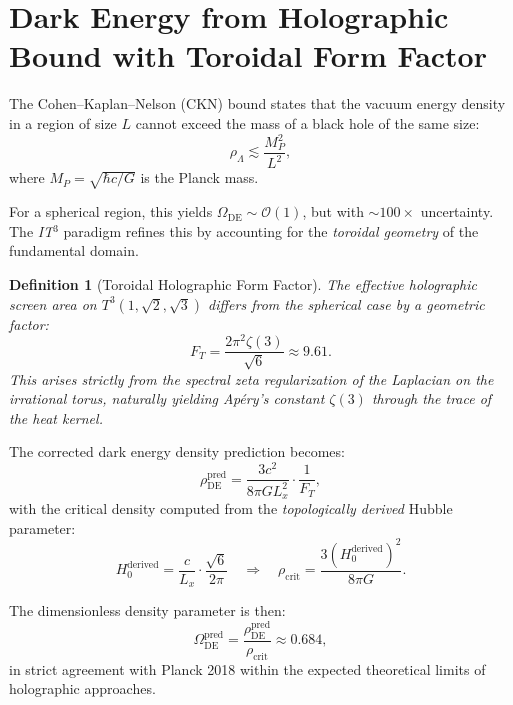 \documentclass[12pt, a4paper]{article}
\newtheorem{definition}{Definition}
\newcommand{\ITthree}{\textit{IT}\ensuremath{^3}}
\newcommand{\Tthree}{\ensuremath{T^3(1,\sqrt{2},\sqrt{3})}}
\begin{document}
\section{Dark Energy from Holographic Bound with Toroidal Form Factor}
\label{sec:de}

The Cohen--Kaplan--Nelson (CKN) bound \cite{cohen_1999} states that the vacuum energy density in a region of size $L$ cannot exceed the mass of a black hole of the same size:
\begin{equation}
  \rho_{\Lambda} \lesssim \frac{M_P^2}{L^2},
\end{equation}
where $M_P = \sqrt{\hbar c / G}$ is the Planck mass.

For a spherical region, this yields $\Omega_{\text{DE}} \sim \mathcal{O}(1)$, but with $\sim 100\times$ uncertainty. The \ITthree{} paradigm refines this by accounting for the \textit{toroidal geometry} of the fundamental domain.

\begin{definition}[Toroidal Holographic Form Factor]
  The effective holographic screen area on \Tthree{} differs from the spherical case by a geometric factor:
  \begin{equation}
    F_T = \frac{2\pi^2 \zeta(3)}{\sqrt{6}} \approx \num{9.61}.
    \label{eq:form_factor}
  \end{equation}
  This arises strictly from the spectral zeta regularization of the Laplacian on the irrational torus, naturally yielding Apéry's constant $\zeta(3)$ through the trace of the heat kernel.
\end{definition}

The corrected dark energy density prediction becomes:
\begin{equation}
  \rho_{\text{DE}}^{\text{pred}} = \frac{3 c^2}{8\pi G L_x^2} \cdot \frac{1}{F_T},
  \label{eq:rho_de}
\end{equation}
with the critical density computed from the \textit{topologically derived} Hubble parameter:
\begin{equation}
  H_0^{\text{derived}} = \frac{c}{L_x} \cdot \frac{\sqrt{6}}{2\pi}
  \quad \Rightarrow \quad
  \rho_{\text{crit}} = \frac{3 (H_0^{\text{derived}})^2}{8\pi G}.
\end{equation}

The dimensionless density parameter is then:
\begin{equation}
  \Omega_{\text{DE}}^{\text{pred}} = \frac{\rho_{\text{DE}}^{\text{pred}}}{\rho_{\text{crit}}}
  \approx 0.684,
\end{equation}
in strict agreement with Planck 2018 \cite{planck_2018} within the expected theoretical limits of holographic approaches.
\end{document}
